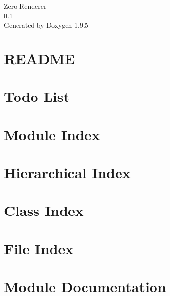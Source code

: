 \documentclass[twoside]{book}
\newcommand{\+}{\discretionary{\mbox{\scriptsize$\hookleftarrow$}}{}{}}
\newcommand{\clearemptydoublepage}{%
    \newpage{\pagestyle{empty}\cleardoublepage}%
  }
\begin{document}
  \raggedbottom
    \hypersetup{pageanchor=false,
                bookmarksnumbered=true,
                pdfencoding=unicode
               }
  \begin{titlepage}
  \vspace*{7cm}
  \begin{center}%
  {\Large Zero-\/\+Renderer}\\
  [1ex]\large 0.\+1 \\
  \vspace*{1cm}
  {\large Generated by Doxygen 1.9.5}\\
  \end{center}
  \end{titlepage}
  \clearemptydoublepage
  \tableofcontents
  \clearemptydoublepage
  \hypersetup{pageanchor=true}
\chapter{README}
\label{md__mnt_renderer__zero_src__resource_layer__file__r_e_a_d_m_e}

\chapter{Todo List}
\label{todo}

\chapter{Module Index}

\chapter{Hierarchical Index}

\chapter{Class Index}

\chapter{File Index}

\chapter{Module Documentation}



\end{document}
